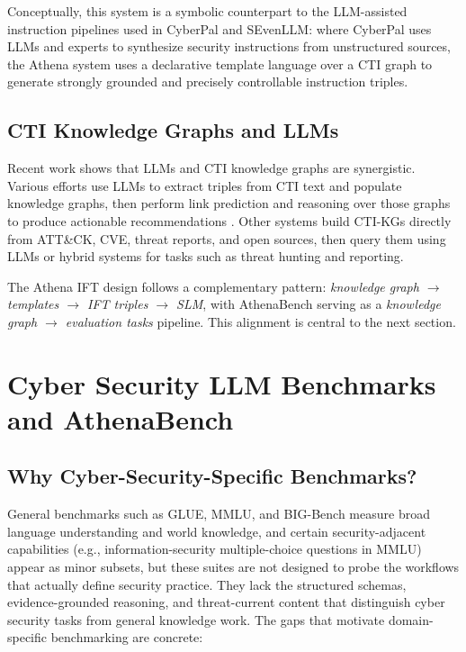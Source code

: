 \documentclass[unnumsec,webpdf,contemporary,large]{oup-authoring-template}
\theoremstyle{thmstyleone}
\theoremstyle{thmstyletwo}
\theoremstyle{thmstylethree}
\begin{document}
Conceptually, this system is a symbolic counterpart to the LLM-assisted instruction pipelines used in CyberPal and SEvenLLM: where CyberPal uses LLMs and experts to synthesize security instructions from unstructured sources, the Athena system uses a declarative template language over a CTI graph to generate strongly grounded and precisely controllable instruction triples.

\subsection{CTI Knowledge Graphs and LLMs}

Recent work shows that LLMs and CTI knowledge graphs are synergistic. Various efforts use LLMs to extract triples from CTI text and populate knowledge graphs, then perform link prediction and reasoning over those graphs to produce actionable recommendations \cite{fieblinger2024kg,zhang2023cyberkg,wu2022opencykg,yu2024ctikg,zhao2024kctiaa}. Other systems build CTI-KGs directly from ATT\&CK, CVE, threat reports, and open sources, then query them using LLMs or hybrid systems for tasks such as threat hunting and reporting.

The Athena IFT design follows a complementary pattern: \emph{knowledge graph $\rightarrow$ templates $\rightarrow$ IFT triples $\rightarrow$ SLM}, with AthenaBench serving as a \emph{knowledge graph $\rightarrow$ evaluation tasks} pipeline. This alignment is central to the next section.

\section{Cyber Security LLM Benchmarks and AthenaBench}
\label{sec:benchmarks}

\subsection{Why Cyber-Security-Specific Benchmarks?}

General benchmarks such as GLUE, MMLU, and BIG-Bench measure broad language understanding and world knowledge, and certain security-adjacent capabilities (e.g., information-security multiple-choice questions in MMLU) appear as minor subsets, but these suites are not designed to probe the workflows that actually define security practice. They lack the structured schemas, evidence-grounded reasoning, and threat-current content that distinguish cyber security tasks from general knowledge work. The gaps that motivate domain-specific benchmarking are concrete:
\end{document}
